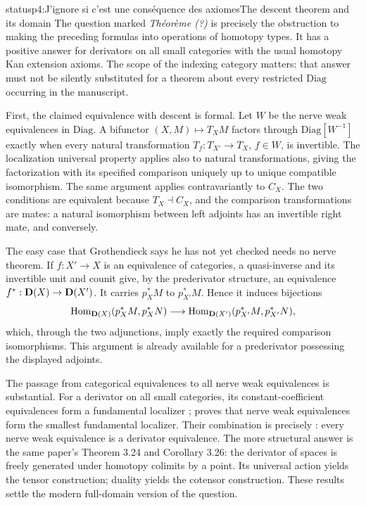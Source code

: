\begin{dcomment}{status}{p4:J'ignore si c'est une conséquence des axiomes}{The descent theorem and its domain}
The question marked \emph{Théorème (?)} is precisely the obstruction to making the preceding formulas into operations of homotopy types. It has a positive answer for derivators on all small categories with the usual homotopy Kan extension axioms. The scope of the indexing category matters: that answer must not be silently substituted for a theorem about every restricted \(\mathrm{Diag}\) occurring in the manuscript.

First, the claimed equivalence with descent is formal. Let \(W\) be the nerve weak equivalences in \(\mathrm{Diag}\). A bifunctor \((X,M)\mapsto T_XM\) factors through \(\mathrm{Diag}[W^{-1}]\) exactly when every natural transformation \(T_f:T_{X'}\to T_X\), \(f\in W\), is invertible. The localization universal property applies also to natural transformations, giving the factorization with its specified comparison uniquely up to unique compatible isomorphism. The same argument applies contravariantly to \(C_X\). The two conditions are equivalent because \(T_X\dashv C_X\), and the comparison transformations are mates: a natural isomorphism between left adjoints has an invertible right mate, and conversely.

The easy case that Grothendieck says he has not yet checked needs no nerve theorem. If \(f:X'\to X\) is an equivalence of categories, a quasi-inverse and its invertible unit and counit give, by the prederivator structure, an equivalence \(f^*:\mathbf{D}(X)\to\mathbf{D}(X')\). It carries \(p_X^*M\) to \(p_{X'}^*M\). Hence it induces bijections
\[
 \mathrm{Hom}_{\mathbf{D}(X)}(p_X^*M,p_X^*N)
 \longrightarrow
 \mathrm{Hom}_{\mathbf{D}(X')}(p_{X'}^*M,p_{X'}^*N),
\]
which, through the two adjunctions, imply exactly the required comparison isomorphisms. This argument is already available for a prederivator possessing the displayed adjoints.

The passage from categorical equivalences to all nerve weak equivalences is substantial. For a derivator on all small categories, its constant-coefficient equivalences form a fundamental localizer \citep[Proposition 3.7]{Cisinski2008}; \citet[Theorem 2.2.11]{Cisinski2004Minimal} proves that nerve weak equivalences form the smallest fundamental localizer. Their combination is precisely \citet[Corollary 3.10]{Cisinski2008}: every nerve weak equivalence is a derivator equivalence. The more structural answer is the same paper's Theorem 3.24 and Corollary 3.26: the derivator of spaces is freely generated under homotopy colimits by a point. Its universal action yields the tensor construction; duality yields the cotensor construction. These results settle the modern full-domain version of the question.


\end{dcomment}
